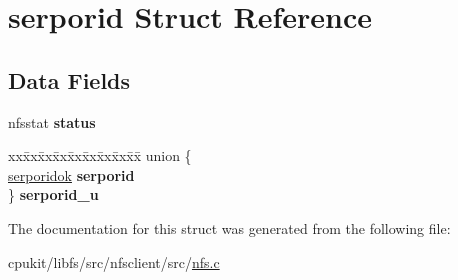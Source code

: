 \hypertarget{structserporid}{}\section{serporid Struct Reference}
\label{structserporid}
\subsection*{Data Fields}
\begin{DoxyCompactItemize}
\item 
\mbox{\label{structserporid_ab6d8e88abb0431ad4763c93cfcff595a}} 
nfsstat {\bfseries status}
\item 
\mbox{\label{structserporid_af9660dc494252015f24b36cf0139e6a7}} 
\begin{tabbing}
xx\=xx\=xx\=xx\=xx\=xx\=xx\=xx\=xx\=\kill
union \{\\
\>\mbox{\hyperlink{structserporidok}{serporidok}} {\bfseries serporid}\\
\} {\bfseries serporid\_u}\\

\end{tabbing}\end{DoxyCompactItemize}


The documentation for this struct was generated from the following file\+:\begin{DoxyCompactItemize}
\item 
cpukit/libfs/src/nfsclient/src/\mbox{\hyperlink{nfs_8c}{nfs.\+c}}\end{DoxyCompactItemize}
